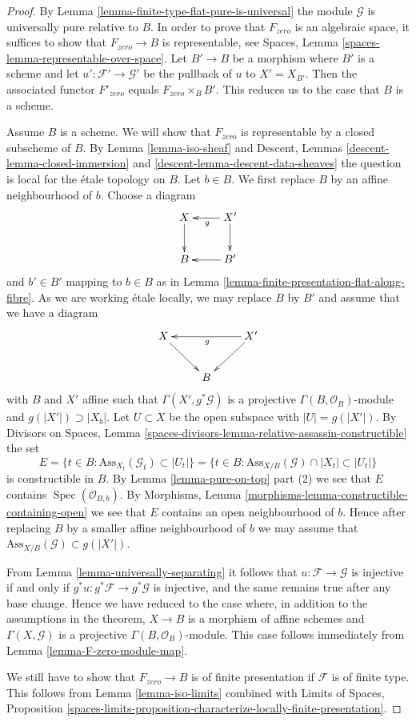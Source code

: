 \documentclass{stacks-project}
\theoremstyle{plain}
\theoremstyle{definition}
\theoremstyle{remark}
\numberwithin{equation}{subsection}
\def\Spec{\mathop{\mathrm{Spec}}}
\begin{document}
\begin{proof}
By Lemma \ref{lemma-finite-type-flat-pure-is-universal}
the module $\mathcal{G}$ is universally pure relative to $B$.
In order to prove that $F_{zero}$ is an algebraic space,
it suffices to show that $F_{zero} \to B$ is representable, see
Spaces, Lemma \ref{spaces-lemma-representable-over-space}.
Let $B' \to B$ be a morphism where $B'$ is a scheme and let
$u' : \mathcal{F}' \to \mathcal{G}'$ be the pullback of $u$ to $X' = X_{B'}$.
Then the associated functor $F'_{zero}$ equals $F_{zero} \times_B B'$.
This reduces us to the case that $B$ is a scheme.

\medskip\noindent
Assume $B$ is a scheme. We will show that $F_{zero}$ is representable
by a closed subscheme of $B$. By Lemma \ref{lemma-iso-sheaf} and
Descent, Lemmas \ref{descent-lemma-closed-immersion} and
\ref{descent-lemma-descent-data-sheaves}
the question is local for the \'etale topology on $B$. Let $b \in B$.
We first replace $B$ by an affine neighbourhood of $b$.
Choose a diagram
$$
\xymatrix{
X \ar[d] & X' \ar[l]^g \ar[d] \\
B & B' \ar[l]
}
$$
and $b' \in B'$ mapping to $b \in B$
as in Lemma \ref{lemma-finite-presentation-flat-along-fibre}.
As we are working \'etale locally, we may replace
$B$ by $B'$ and assume that we have a diagram
$$
\xymatrix{
X \ar[rd] & & X' \ar[ll]^g \ar[ld] \\
& B
}
$$
with $B$ and $X'$ affine such that $\Gamma(X', g^*\mathcal{G})$
is a projective $\Gamma(B, \mathcal{O}_B)$-module and
$g(|X'|) \supset |X_b|$. Let $U \subset X$ be the open subspace
with $|U| = g(|X'|)$. By
Divisors on Spaces, Lemma
\ref{spaces-divisors-lemma-relative-assassin-constructible} the set
$$
E = \{t \in B : \text{Ass}_{X_t}(\mathcal{G}_t) \subset |U_t|\} =
\{t \in B : \text{Ass}_{X/B}(\mathcal{G}) \cap |X_t| \subset |U_t|\}
$$
is constructible in $B$. By Lemma \ref{lemma-pure-on-top} part (2)
we see that $E$ contains $\Spec(\mathcal{O}_{B, b})$. By
Morphisms, Lemma \ref{morphisms-lemma-constructible-containing-open}
we see that $E$ contains an open neighbourhood of $b$. Hence after
replacing $B$ by a smaller affine neighbourhood of $b$ we may assume that
$\text{Ass}_{X/B}(\mathcal{G}) \subset g(|X'|)$.

\medskip\noindent
From Lemma \ref{lemma-universally-separating}
it follows that $u : \mathcal{F} \to \mathcal{G}$ is injective if and only if
$g^*u : g^*\mathcal{F} \to g^*\mathcal{G}$ is injective, and the same remains
true after any base change. Hence we have reduced to the case where,
in addition to the assumptions in the theorem, $X \to B$ is a morphism of
affine schemes and $\Gamma(X, \mathcal{G})$ is a projective
$\Gamma(B, \mathcal{O}_B)$-module. This case follows immediately from
Lemma \ref{lemma-F-zero-module-map}.

\medskip\noindent
We still have to show that $F_{zero} \to B$ is of finite presentation if
$\mathcal{F}$ is of finite type. This follows from
Lemma \ref{lemma-iso-limits} combined with
Limits of Spaces, Proposition
\ref{spaces-limits-proposition-characterize-locally-finite-presentation}.
\end{proof}
\end{document}
